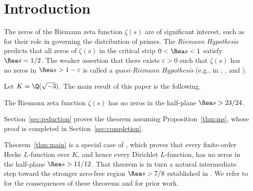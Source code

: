 \section{Introduction}\label{sec:intro}

The zeros of the Riemann zeta function $\zeta(s)$ \cite{Rie59} are of significant interest, such as for their role in governing the distribution of primes. The \emph{Riemann Hypothesis} predicts that all zeros of $\zeta(s)$ in the critical strip $0 < \Rea s < 1$ satisfy $\Rea s = 1/2$.
The weaker assertion that there exists
$\varepsilon>0$ such that $\zeta(s)$ has no zeros in
$\Rea s>1-\varepsilon$ is called a \emph{quasi-Riemann Hypothesis}
(e.g., in \cite[\S1]{BG17}, \cite[p.~274]{MS02}, and \cite[\S2]{BR18}).

Let $K=\Q(\sqrt{-3})$. The main result of this paper is the following.

\begin{theorem}\label{thm:main}
The Riemann zeta function $\zeta(s)$ has no zeros in the half-plane $\Rea s>23/24$.
\end{theorem}

Section~\ref{sec:reduction} proves the theorem assuming
Proposition~\ref{thm:ms}, whose proof is completed in
Section~\ref{sec:completion}.

Theorem~\ref{thm:main} is a special case of \cite[Theorem~1.1]{OpenAI26b}, which proves that every finite-order Hecke $L$-function over $K$, and hence every Dirichlet $L$-function, has no zeros in the half-plane $\Rea s>11/12$. That theorem is in turn a natural intermediate step toward the stronger zero-free region $\Rea s>7/8$ established in \cite[Theorem~1.1]{OpenAI26}. We refer to \cite[\S1]{OpenAI26b} for the consequences of these theorems and for prior work.

